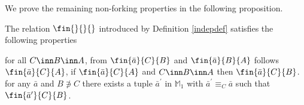 \medskip
We prove the remaining non-forking properties in the following proposition.
\begin{prop}\label{indepnotion}
The relation $\fin{}{}{}$ introduced by Definition \ref{indepdef} satisfies the following properties
\begin{description}
for all $C\inn B\inn A$, from $\fin{\bar a}{C}{B}$ and $\fin{\bar a}{B}{A}$ follows $\fin{\bar a}{C}{A}$,
if $\fin{\bar a}{C}{A}$ and $C\inn B\inn A$ then $\fin{\bar a}{C}{B}$.
for any $\bar a$ and $B\nni C$ there exists a tuple $\bar a^{\prime}$ in $\mathbb{M}_{1}$ with $\bar a^{\prime}\equiv_{C}\bar a$
such that $\fin{\bar a^{\prime}}{C}{B}$.
\end{description}
\end{prop}
